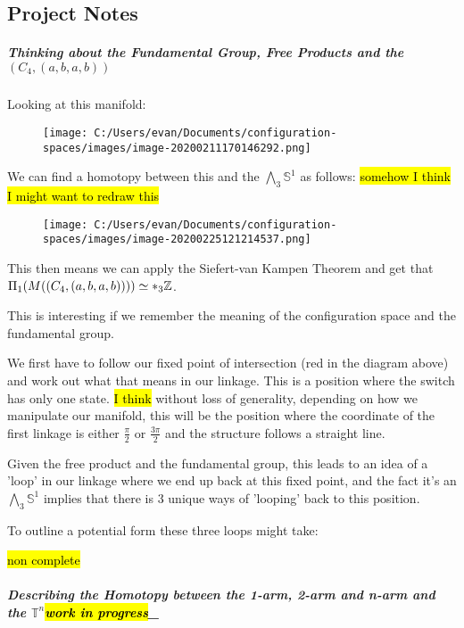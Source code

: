 \documentclass[
]{article}
\begin{document}
\hypertarget{header-n40}{%
\subsection{Project Notes}\label{header-n40}}

\hypertarget{header-n41}{%
\subparagraph{\texorpdfstring{Thinking about the Fundamental Group, Free
Products and the \((C_4, (a,b,a,b))\)
}{Thinking about the Fundamental Group, Free Products and the (C\_4, (a,b,a,b)) }}\label{header-n41}}

Looking at this manifold:

\begin{figure}
\centering
\texttt{[image: C:/Users/evan/Documents/configuration-spaces/images/image-20200211170146292.png]}
\caption{}
\end{figure}

We can find a homotopy between this and the \(\bigwedge_3 \mathbb S^1\)
as follows: \hl{somehow I think I might want to redraw this}

\begin{figure}
\centering
\texttt{[image: C:/Users/evan/Documents/configuration-spaces/images/image-20200225121214537.png]}
\caption{}
\end{figure}

This then means we can apply the Siefert-van Kampen Theorem and get that
\(\Pi_1(M((C_4, (a,b,a,b)))) \simeq \bold *_3 \mathbb Z\).

This is interesting if we remember the meaning of the configuration
space and the fundamental group.

We first have to follow our fixed point of intersection (red in the
diagram above) and work out what that means in our linkage. This is a
position where the switch has only one state. \hl{I think} without loss
of generality, depending on how we manipulate our manifold, this will be
the position where the coordinate of the first linkage is either
\(\frac \pi 2\) or \(\frac {3\pi} 2\) and the structure follows a
straight line.

Given the free product and the fundamental group, this leads to an idea
of a 'loop' in our linkage where we end up back at this fixed point, and
the fact it's an \(\bigwedge_3 \mathbb S^1\) implies that there is 3
unique ways of 'looping' back to this position.

To outline a potential form these three loops might take:

\hl{non complete}

\hypertarget{header-n52}{%
\subparagraph{\texorpdfstring{Describing the Homotopy between the 1-arm,
2-arm and n-arm and the \(\mathbb T^n \)\hl{work in
progress}\_}{Describing the Homotopy between the 1-arm, 2-arm and n-arm and the \textbackslash mathbb T\^{}n work in progress\_}}\label{header-n52}}
\end{document}
